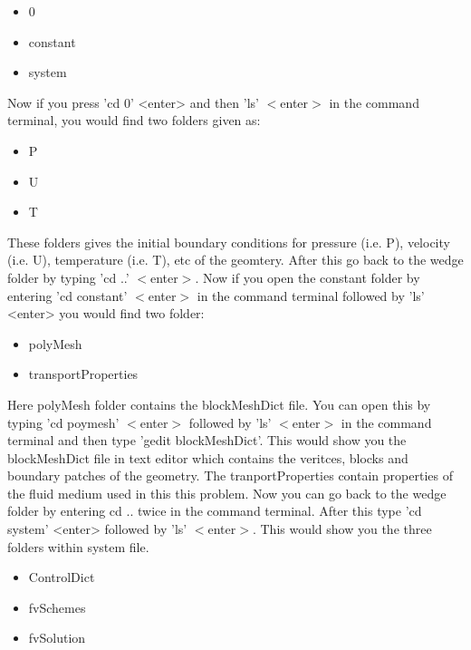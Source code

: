 \documentclass[a4paper,12pt]{report}
\begin{document}
\begin{itemize}
  \item 0
  \item constant
  \item system
\end{itemize}

\flushleft Now if you press 'cd 0' <enter> and then 'ls' $<$enter$>$ in the command terminal, you would find two folders given as:

\begin{itemize}
  \item P
  \item U
  \item T
\end{itemize}

\flushleft These folders gives the initial boundary conditions for pressure (i.e. P), velocity (i.e. U), temperature (i.e. T), etc of the geomtery. After this go back to the wedge folder by typing 'cd ..' $<$enter$>$.
\flushleft Now if you open the constant folder by entering 'cd constant' $<$enter$>$ in the command terminal followed by 'ls' <enter> you would find two folder$:$

\begin{itemize}
  \item polyMesh
  \item transportProperties
\end{itemize}

\flushleft Here polyMesh folder contains the blockMeshDict file. You can open this by typing 'cd poymesh' $<$enter$>$ followed by 'ls' $<$enter$>$ in the command terminal and then type 'gedit blockMeshDict'. This would show you the blockMeshDict file in text editor which contains the veritces, blocks and boundary patches of the geometry. The tranportProperties contain properties of the fluid medium used in this this problem. 
\flushleft Now you can go back to the wedge folder by entering cd .. twice in the command terminal. After this type 'cd system' <enter> followed by 'ls' $<$enter$>$. This would show you the three folders within system file.

\begin{itemize}
  \item ControlDict
  \item fvSchemes
  \item fvSolution
\end{itemize}
\end{document}
